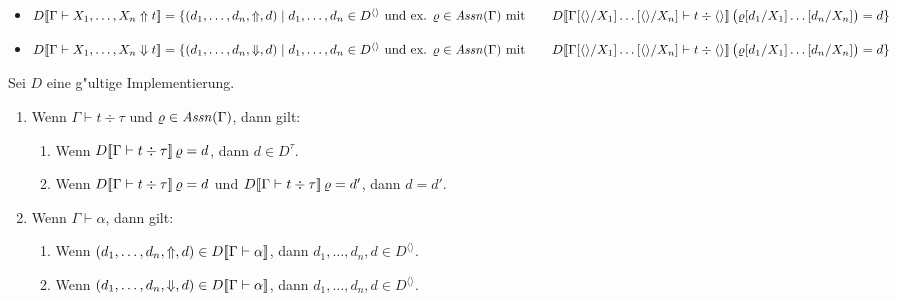 \documentclass[%
  12pt,%
  a4paper,%
]{article}
\newcommand{\Tj}[3]{{#1}\vdash{#2}\div{#3}}
\begin{document}
\begin{itemize}
\item $D\sem{\Gamma \vdash X_1,\ldots,X_n \Uparrow t} \\
  =
  \{(d_1,\ldots,d_n,\Uparrow,d) \mid 
    \text{$d_1,\ldots,d_n \in D^{\langle \rangle}$ und ex. $\varrho \in \Assn(\Gamma)$ mit } \\
    \hspace*{17pt} D\sem{\Tj{\Gamma[\langle \rangle/X_1]\ldots[\langle \rangle/X_n]}{t}{\langle \rangle}}\,\bigl(\varrho[d_1/X_1]\ldots[d_n/X_n]\bigr) = d
  \}$
\item $D\sem{\Gamma \vdash X_1,\ldots,X_n \Downarrow t} \\
  =
  \{(d_1,\ldots,d_n,\Downarrow,d) \mid 
    \text{$d_1,\ldots,d_n \in D^{\langle \rangle}$ und ex. $\varrho \in \Assn(\Gamma)$ mit } \\
    \hspace*{17pt} D\sem{\Tj{\Gamma[\langle \rangle/X_1]\ldots[\langle \rangle/X_n]}{t}{\langle \rangle}}\,\bigl(\varrho[d_1/X_1]\ldots[d_n/X_n]\bigr) = d
  \}$
\end{itemize}

\begin{lemma} \label{lem:Wohldefiniertheit_der_Semantik}
  Sei $D$ eine g"ultige Implementierung.
  \begin{enumerate}
  \item Wenn $\Tj{\Gamma}{t}{\tau}$ und $\varrho \in \mathit{Assn}(\Gamma)$, dann gilt:
    \begin{enumerate}
    \item Wenn $D\sem{\Tj{\Gamma}{t}{\tau}}\,\varrho = d$, dann $d \in D^\tau$.
    \item Wenn $D\sem{\Tj{\Gamma}{t}{\tau}}\,\varrho = d$ und $D\sem{\Tj{\Gamma}{t}{\tau}}\,\varrho = d'$,
      dann $d = d'$.
    \end{enumerate}

  \item Wenn $\Gamma \vdash \alpha$, dann gilt:
    \begin{enumerate}
    \item Wenn $(d_1,\ldots,d_n,\Uparrow,d) \in D[\![\Gamma \vdash \alpha]\!]$,
      dann $d_1,\ldots,d_n,d \in D^{\langle\rangle}$.
    \item Wenn $(d_1,\ldots,d_n,\Downarrow,d) \in D[\![\Gamma \vdash \alpha]\!]$,
      dann $d_1,\ldots,d_n,d \in D^{\langle\rangle}$.
    \end{enumerate}
  \end{enumerate}
\end{lemma}
\end{document}
